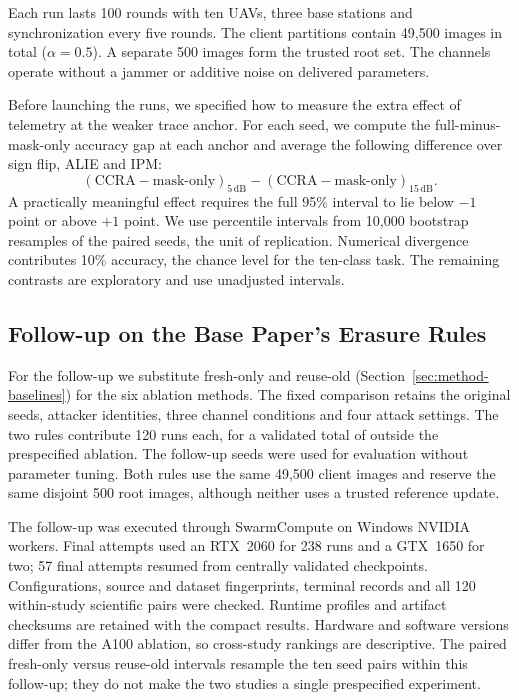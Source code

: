 Each run lasts 100 rounds with ten UAVs, three base stations and synchronization
every five rounds. The client partitions contain 49{,}500 images in total
($\alpha=0.5$). A separate 500 images form the trusted root set. The channels
operate without a jammer or additive noise on delivered parameters.

Before launching the runs, we specified how to measure the extra effect of
telemetry at the weaker trace anchor. For each seed, we compute the
full-minus-mask-only accuracy gap at each anchor and average the following
difference over sign flip, ALIE and IPM:
\[
  (\text{CCRA}-\text{mask-only})_{5\,\mathrm{dB}}
  -(\text{CCRA}-\text{mask-only})_{15\,\mathrm{dB}}.
\]
A practically meaningful effect requires the full 95\% interval to lie below
$-1$ point or above $+1$ point. We use percentile intervals from 10{,}000
bootstrap resamples of the paired seeds, the unit of replication. Numerical
divergence contributes 10\% accuracy, the chance level for the ten-class task.
The remaining contrasts are exploratory and use unadjusted intervals.

\subsection{Follow-up on the Base Paper's Erasure Rules}
\label{sec:bp-protocol}
For the follow-up we substitute fresh-only and reuse-old
(Section~\ref{sec:method-baselines}) for the six ablation methods. The fixed
comparison retains the original seeds, attacker identities, three channel
conditions and four attack settings. The two rules contribute 120 runs each,
for a validated total of \BpNumRuns{} outside the prespecified ablation. The
follow-up seeds were used for evaluation without parameter tuning. Both rules use the same 49{,}500 client images and reserve the same
disjoint 500 root images, although neither uses a trusted reference update.

The follow-up was executed through SwarmCompute on Windows NVIDIA workers. Final
attempts used an RTX~2060 for 238 runs and a GTX~1650 for two; 57 final attempts
resumed from centrally validated checkpoints. Configurations, source and dataset
fingerprints, terminal records and all 120 within-study scientific pairs were
checked. Runtime profiles and artifact checksums are retained with the compact
results. Hardware and software versions differ from the A100 ablation, so
cross-study rankings are descriptive. The paired fresh-only versus reuse-old
intervals resample the ten seed pairs within this follow-up; they do not make the
two studies a single prespecified experiment.

